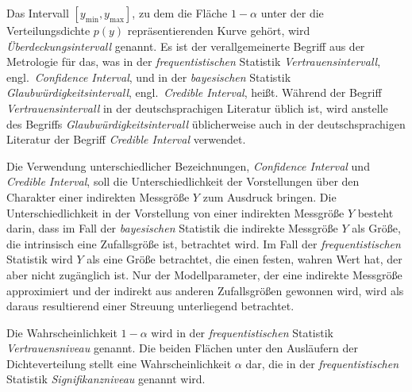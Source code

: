 Das Intervall $[y_\mathrm{min}, y_\mathrm{max}]$, zu dem die Fläche $1 - \alpha$ unter der die
Verteilungsdichte $p(y)$ repräsentierenden Kurve gehört, wird \textsl{Überdeckungsintervall} genannt.
Es ist der verallgemeinerte Begriff aus der Metrologie für das, was in der
\textsl{frequentistischen} Statistik \textsl{Vertrauensintervall},
engl.\  \textsl{Confidence Interval}, und in der \textsl{bayesischen} Statistik
\textsl{Glaubwürdigkeitsintervall}, engl.\ \textsl{Credible Interval},
heißt. Während der Begriff \textsl{Vertrauensintervall} in der deutschsprachigen
Literatur üblich ist, wird anstelle des Begriffs \textsl{Glaubwürdigkeitsintervall} üblicherweise
auch in der deutschsprachigen Literatur der Begriff \textsl{Credible Interval} verwendet.

Die Verwendung unterschiedlicher Bezeichnungen, \textsl{Confidence Interval} und
\textsl{Credible Interval}, soll die Unterschiedlichkeit der Vorstellungen
über den Charakter einer indirekten Messgröße $Y$ zum Ausdruck bringen.
Die Unterschiedlichkeit in der Vorstellung von einer indirekten Messgröße $Y$ besteht darin,
dass im Fall der \textsl{bayesischen} Statistik
die indirekte Messgröße $Y$ als Größe, die intrinsisch eine Zufallsgröße ist, betrachtet
wird. Im Fall der \textsl{frequentistischen} Statistik wird $Y$ als eine Größe betrachtet,
die einen festen, wahren Wert hat, der aber nicht zugänglich ist. Nur der
Modellparameter, der eine indirekte Messgröße approximiert und der indirekt aus anderen
Zufallsgrößen gewonnen wird, wird als daraus resultierend einer Streuung unterliegend betrachtet.

Die Wahrscheinlichkeit $1 - \alpha$ wird in der \textsl{frequentistischen} Statistik
\textsl{Vertrauensniveau} genannt. Die beiden Flächen unter den
Ausläufern der Dichteverteilung stellt eine Wahrscheinlichkeit $\alpha$ dar, die in der
\textsl{frequentistischen} Statistik \textsl{Signifikanzniveau} genannt wird.


